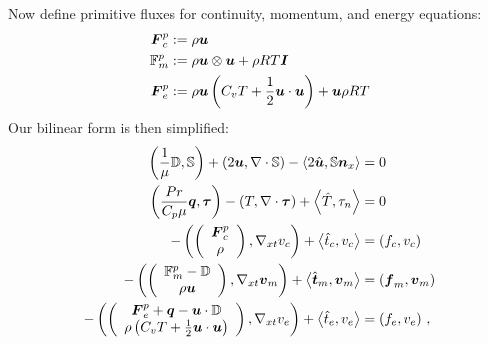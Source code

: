 \documentclass{article}
\begin{document}
Now define primitive fluxes for continuity, momentum, and energy equations:
\begin{align*}
\bfF^p_c&:=\rho\bfu\\
\mathbb{F}^p_m&:=\rho\bfu\otimes\bfu+\rho RT\bfI\\
\bfF^p_e&:=\rho\bfu\LRp{C_v T+\frac{1}{2}\bfu\cdot\bfu}+\bfu\rho RT
\end{align*}
Our bilinear form is then simplified:
\begin{subequations}
\label{eq:primitiveBF}
\begin{align}
	\LRp{\frac{1}{\mu}\mathbb{D},\mathbb{S}}+\LRp{2\bfu,\Div\mathbb{S}}
	-\LRa{2\hat\bfu,\mathbb{S}\bfn_x}&=0\\
	\LRp{\frac{Pr}{C_p\mu}\bfq,\bftau}-\LRp{T,\Div\bftau}+\LRa{\hat T,\tau_n}&=0\\
	-\LRp{\vecttwo{\bfF^p_c}{\rho},\Gradxt v_c}+\LRa{\hat t_c,v_c}&=\LRp{f_c,v_c}\\
	-\LRp{\vecttwo{\mathbb{F}^p_m-\mathbb{D}}{\rho\bfu},\Gradxt\bfv_m}+\LRa{\hat\bft_m,\bfv_m}&=\LRp{\bff_m,\bfv_m}\\
	-\LRp{\vecttwo{\bfF^p_e+\bfq-\bfu\cdot\mathbb{D}}{\rho\LRp{C_v T+\frac{1}{2}\bfu\cdot\bfu}},\Gradxt v_e}
	+\LRa{\hat t_e,v_e}&=\LRp{f_e,v_e}\,,
\end{align}
\end{subequations}
\end{document}
